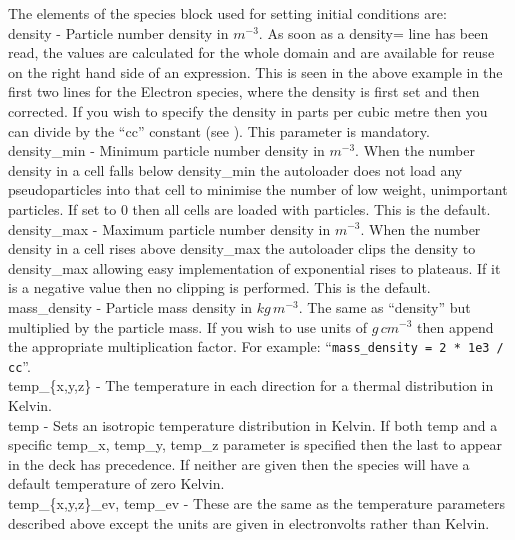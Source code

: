 The elements of the species block used for setting
initial conditions are:\\

{\emphtext density} - Particle number density in $m^{-3}$.
As soon as a density= line has been read, the values are
calculated for the whole domain and are available for reuse on the right hand
side of an expression. This is seen in the above example in the first two lines
for the Electron species, where the density is first set and then corrected.
If you wish to specify the density in parts per cubic metre then you can
divide by the ``cc'' constant (see ).
This parameter is mandatory.\\

{\emphtext density\_min} - Minimum particle number density in $m^{-3}$.
When the number density in a cell falls below density\_min the
autoloader does not load any pseudoparticles into that cell to minimise the
number of low weight, unimportant particles. If set to 0 then all cells are
loaded with particles. This is the default.\\

{\emphtext density\_max} - Maximum particle number density in $m^{-3}$.
When the number density in a cell rises above density\_max the
autoloader clips the density to density\_max allowing easy
implementation of exponential rises to plateaus. If it is a negative value
then no clipping is performed. This is the default.\\

{\emphtext mass\_density} - Particle mass density in $kg\,m^{-3}$. The same
as ``density'' but multiplied by the particle mass. If you wish to use units
of $g\,cm^{-3}$ then append the appropriate multiplication factor.
For example: ``\verb|mass_density = 2 * 1e3 / cc|''.\\

{\emphtext temp\_\{x,y,z\}} - The temperature in each direction for a thermal
distribution in Kelvin.\\

{\emphtext temp} - Sets an isotropic temperature distribution in Kelvin.
If both temp and a specific
temp\_x, temp\_y, temp\_z parameter is specified then the last to appear in the
deck has precedence. If neither are given then the species will have a default
temperature of zero Kelvin.\\

{\emphtext temp\_\{x,y,z\}\_ev, temp\_ev} - These are the same as the
temperature parameters described above except the units are given in
electronvolts rather than Kelvin.\\

